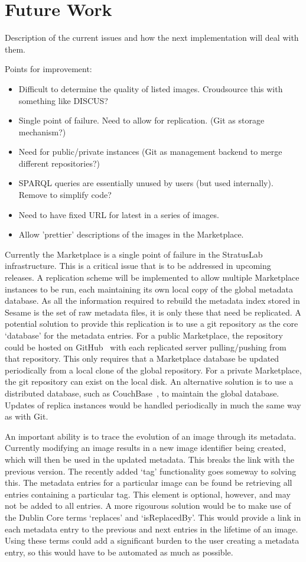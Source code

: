 \section{Future Work}

Description of the current issues and how the next implementation will
deal with them. 

Points for improvement:
\begin{itemize}
\item Difficult to determine the quality of listed images.  Croudsource
  this with something like DISCUS?
\item Single point of failure.  Need to allow for replication.  (Git as
  storage mechanism?)
\item Need for public/private instances (Git as management backend to
  merge different repositories?)
\item SPARQL queries are essentially unused by users (but used
  internally).  Remove to simplify code?
\item Need to have fixed URL for latest in a series of images.
\item Allow 'prettier' descriptions of the images in the Marketplace.
\end{itemize}

Currently the Marketplace is a single point of failure in the StratusLab infrastructure. This is 
a critical issue that is to be addressed in upcoming releases. A replication scheme will be 
implemented to allow multiple Marketplace instances to be run, each maintaining its own local
copy of the global metadata database. As all the information required to rebuild the metadata index
stored in Sesame is the set of raw metadata files, it is only these that need be replicated. A potential solution 
to provide this replication is to use a git repository as the core `database' for the metadata entries.  
For a public Marketplace, the repository could be hosted on GitHub~\cite{github} with each replicated server 
pulling/pushing from that repository. This only requires that a Marketplace database be updated periodically 
from a local clone of the global repository.  For a private Marketplace, the git repository can exist on the local disk.
An alternative solution is to use a distributed database, such as CouchBase~\cite{couchbase}, to maintain the
  global database. Updates of replica instances would be handled periodically in much the same way as with Git.

An important ability is to trace the evolution of an image through its metadata. Currently modifying an image 
results in a new image identifier being created, which will then be used in the updated metadata. This 
breaks the link with the previous version. The recently added `tag' functionality goes someway to solving this.  
The metadata entries for a particular image can be found be retrieving all entries containing a particular tag. 
This element is optional, however, and may not be added to all entries. A more rigourous solution would be 
to make use of the Dublin Core terms `replaces' and `isReplacedBy'. This would provide a link in each metadata 
entry to the previous and next entries in the lifetime of an image. Using these terms could add a significant 
burden to the user creating a metadata entry, so this would have to be automated as much as possible.